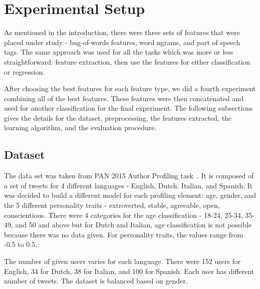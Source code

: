 \documentclass[a4paper]{llncs}
\begin{document}
\section{Experimental Setup}
As mentioned in the introduction, there were three sets of features that were placed under study - bag-of-words features, word ngrams, and  part of speech tags. The same approach was used for all the tasks which was more or less straightforward: feature extraction, then use the features for either classification or regression. 



After choosing the best features for each feature type, we did a fourth experiment combining all of the best features. These features were then concatenated and used for another classification for the final experiment. The following subsections gives the details for the dataset, preprocessing, the features extracted, the learning algorithm, and the evaluation procedure. 

\subsection{Dataset}
The data set was taken from PAN 2015 Author Profiling task~\cite{rangel2015overview}. It is composed of a set of tweets for 4 different languages - English, Dutch, Italian, and Spanish. It was decided to build a different model for each profiling element: age, gender, and the 5 different personality traits - extroverted, stable, agreeable, open, conscientious. There were 4 categories for the age classification - 18-24, 25-34, 35-49, and 50 and above but for Dutch and Italian, age classification is not possible because there was no data given. For personality traits, the values range from -0.5 to 0.5.

The number of given users varies for each language. There were 152 users for English, 34 for Dutch, 38 for Italian, and 100 for Spanish. Each user has different number of tweets. The dataset is balanced based on gender. 
\end{document}
